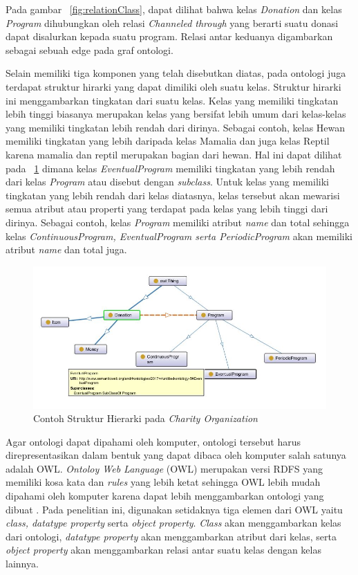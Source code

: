 Pada gambar \pic~\ref{fig:relationClass}, dapat dilihat bahwa kelas \textit{Donation} dan kelas \textit{Program} dihubungkan oleh relasi \textit{Channeled through} yang berarti suatu donasi dapat disalurkan kepada suatu program. Relasi antar keduanya digambarkan sebagai sebuah edge pada graf ontologi. 

Selain memiliki tiga komponen yang telah disebutkan diatas, pada ontologi juga terdapat struktur hirarki yang dapat dimiliki oleh suatu kelas. Struktur hirarki ini menggambarkan tingkatan dari suatu kelas. Kelas yang memiliki tingkatan lebih tinggi biasanya merupakan kelas yang bersifat lebih umum dari kelas-kelas yang memiliki tingkatan lebih rendah dari dirinya. Sebagai contoh, kelas Hewan memiliki tingkatan yang lebih daripada kelas Mamalia dan juga kelas Reptil karena mamalia dan reptil merupakan bagian dari hewan. Hal ini dapat dilihat pada \pic~\ref{fig:subClass} dimana kelas \textit{EventualProgram} memiliki tingkatan yang lebih rendah dari kelas \textit{Program} atau disebut dengan \textit{subclass}. Untuk kelas yang memiliki tingkatan yang lebih rendah dari kelas diatasnya, kelas tersebut akan mewarisi semua atribut atau properti yang terdapat pada kelas yang lebih tinggi dari dirinya. Sebagai contoh, kelas \textit{Program} memiliki atribut \textit{name} dan total sehingga kelas \textit{ContinuousProgram, EventualProgram serta PeriodicProgram} akan memiliki atribut \textit{name} dan total juga.

\begin{figure}
	\centering
	\includegraphics[width=1\textwidth]
	{pics/subClass.jpg}
	\caption{Contoh Struktur Hierarki pada \textit{Charity Organization}}
	\label{fig:subClass}
\end{figure}
\vspace{-0.3cm}

Agar ontologi dapat dipahami oleh komputer, ontologi tersebut harus direpresentasikan dalam bentuk yang dapat dibaca oleh komputer salah satunya adalah OWL. \textit{Ontoloy Web Language} (OWL) merupakan versi RDFS yang memiliki kosa kata dan \textit{rules} yang lebih ketat sehingga OWL lebih mudah dipahami oleh komputer karena dapat lebih menggambarkan ontologi yang dibuat \citep{owl.overview}. Pada penelitian ini, digunakan setidaknya tiga elemen dari OWL yaitu \textit{class, datatype property} serta \textit{object property}. \textit{Class} akan menggambarkan kelas dari ontologi, \textit{datatype property} akan menggambarkan atribut dari kelas, serta \textit{object property} akan menggambarkan relasi antar suatu kelas dengan kelas lainnya.
